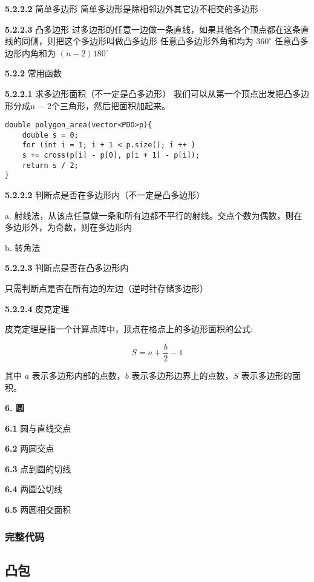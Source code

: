 \documentclass[12pt]{article}
\begin{document}
\textbf{5.2.2.2} 简单多边形
简单多边形是除相邻边外其它边不相交的多边形

\textbf{5.2.2.3} 凸多边形
过多边形的任意一边做一条直线，如果其他各个顶点都在这条直线的同侧，则把这个多边形叫做凸多边形
任意凸多边形外角和均为 $360^{\circ}$
任意凸多边形内角和为 $(n−2)180^{\circ}$

\textbf{5.2.2} 常用函数

\textbf{5.2.2.1} 求多边形面积（不一定是凸多边形）
我们可以从第一个顶点出发把凸多边形分成n − 2个三角形，然后把面积加起来。

\begin{lstlisting}[style=C++]
double polygon_area(vector<PDD>p){
	double s = 0;
	for (int i = 1; i + 1 < p.size(); i ++ )
	s += cross(p[i] - p[0], p[i + 1] - p[i]);
	return s / 2;
}
\end{lstlisting}

\textbf{5.2.2.2} 判断点是否在多边形内（不一定是凸多边形）
      
a. 射线法，从该点任意做一条和所有边都不平行的射线。交点个数为偶数，则在多边形外，为奇数，则在多边形内

b. 转角法

\textbf{5.2.2.3} 判断点是否在凸多边形内

只需判断点是否在所有边的左边（逆时针存储多边形）

\textbf{5.2.2.4} 皮克定理

皮克定理是指一个计算点阵中，顶点在格点上的多边形面积的公式:

$$
S = a + \frac{b}{2} - 1
$$

其中 $a$ 表示多边形内部的点数，$b$ 表示多边形边界上的点数，$S$ 表示多边形的面积。

\textbf{6. 圆}

\textbf{6.1} 圆与直线交点

\textbf{6.2} 两圆交点

\textbf{6.3} 点到圆的切线

\textbf{6.4} 两圆公切线

\textbf{6.5} 两圆相交面积

\newpage

\subsubsection{完整代码}



\newpage

\subsection{凸包}
\end{document}
